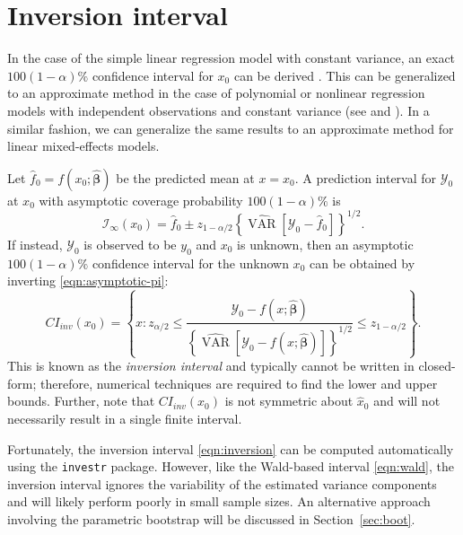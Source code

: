 \documentclass{article}\usepackage[]{graphicx}\usepackage[]{color}
\newcommand{\VAR}{\operatorname{VAR}}
\begin{document}

\section{Inversion interval}\label{sec:inversion}

In the case of the simple linear regression model with constant variance, an exact $100(1-\alpha)\%$ confidence interval for $x_0$ can be derived \citep{graybill-theory-1976}.  This can be generalized to an approximate method in the case of polynomial or nonlinear regression models with independent observations and constant variance (see \citet{seber-nonlinear-2003} and \citet{huet-statistical-2004}).  In a similar fashion, we can generalize the same results to an approximate method for linear mixed-effects models.  

Let $\widehat{f}_0 = f\left(x_0; \widehat{\bm{\beta}}\right)$ be the predicted mean at $x = x_0$.  A prediction interval for $\mathcal{Y}_0$ at $x_0$ with asymptotic coverage probability $100(1-\alpha)\%$ is
\begin{equation}
\label{eqn:asymptotic-pi}
  \mathcal{I}_\infty\left(x_0\right) = \widehat{f}_0 \pm z_{1-\alpha/2}\left\{ \widehat{\VAR}\left[\mathcal{Y}_0 - \widehat{f}_0\right] \right\}^{1/2}.
\end{equation}
If instead, $\mathcal{Y}_0$ is observed to be $y_0$ and $x_0$ is unknown, then an asymptotic $100(1-\alpha)\%$ confidence interval for the unknown $x_0$ can be obtained by inverting \eqref{eqn:asymptotic-pi}:
\begin{equation}
\label{eqn:inversion}
  CI_{inv}\left(x_0\right) = \left\{ x: z_{\alpha/2} \le \frac{\mathcal{Y}_0-f\left(x; \widehat{\bm{\beta}}\right)}{\left\{ \widehat{\VAR}\left[\mathcal{Y}_0 - f\left(x; \widehat{\bm{\beta}}\right)\right] \right\}^{1/2}} \le z_{1-\alpha/2} \right\}.
\end{equation}
This is known as the \emph{inversion interval} and typically cannot be written in closed-form; therefore, numerical techniques are required to find the lower and upper bounds.  Further, note that $CI_{inv}\left(x_0\right)$ is not symmetric about $\widehat{x}_0$ and will not necessarily result in a single finite interval.

Fortunately, the inversion interval \eqref{eqn:inversion} can be computed automatically using the \texttt{investr} package.  However, like the Wald-based interval \eqref{eqn:wald}, the inversion interval ignores the variability of the estimated variance components and will likely perform poorly in small sample sizes.  An alternative approach involving the parametric bootstrap will be discussed in Section~\ref{sec:boot}.
\end{document}

